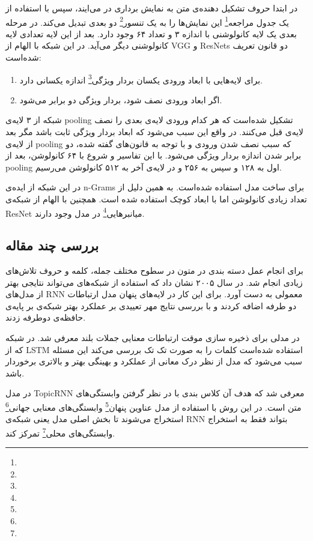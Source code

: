 \documentclass[12pt, a4paper, oneside]{report}
\begin{document}
در ابتدا حروف تشکیل دهنده‌ی متن به نمایش برداری در می‌ایند، سپس با استفاده از یک
جدول مراجعه\footnote{}
این نمایش‌ها را به یک
تنسور\footnote{}
دو بعدی تبدیل می‌کند. در مرحله بعدی یک لایه کانولوشنی با اندازه ۳ و تعداد ۶۴ وجود دارد. بعد از این
لایه تعدادی لایه کانولوشنی دیگر می‌آید. در این شبکه با الهام از
VGG
و
ResNets
دو قانون تعریف شده‌است:

\begin{enumerate}
    \item برای لایه‌هایی با ابعاد ورودی یکسان بردار ویژگی\footnote{} اندازه یکسانی دارد.
    \item اگر ابعاد ورودی نصف شود، بردار ویژگی دو برابر می‌شود.
\end{enumerate}

شبکه از ۳ لایه‌ی
pooling
تشکیل شده‌است که هر کدام ورودی لایه‌ی بعدی را نصف لایه‌ی قبل می‌کنند. در واقع این سبب می‌شود که ابعاد
بردار ویژگی ثابت باشد مگر بعد از لایه‌ی
pooling
که سبب نصف شدن ورودی و با توجه به قانون‌های گفته شده، دو برابر شدن اندازه بردار ویژگی می‌شود.
با این تفاسیر و شروع با ۶۴ کانولوشن، بعد از
pooling
اول به ۱۲۸ و سپس به ۲۵۶ و در لایه‌ی آخر به ۵۱۲ کانولوشن می‌رسیم.

در این شبکه از ایده‌ی
n-Grams
برای ساخت مدل استفاده شده‌است. به همین دلیل از تعداد زیادی کانولوشن اما با ابعاد کوچک استفاده شده است.
همچنین با الهام از شبکه‌ی
ResNet
میانبر‌هایی\footnote{}
در مدل وجود دارند.

\subsection{بررسی چند مقاله}

برای انجام عمل دسته بندی در متون در سطوح مختلف جمله، کلمه و حروف تلاش‌های زیادی انجام شد.
\cite{graves2005framewise}
در سال ۲۰۰۵ نشان داد که استفاده از شبکه‌های
می‌تواند نتایجی بهتر از مدل‌های
RNN
معمولی به دست آورد. برای این کار در لایه‌های پنهان مدل ارتباطات دو طرفه اضافه کردند و با بررسی نتایج مهر تعییدی
بر عملکرد بهتر شبکه‌ی بر پایه‌ی حافظه‌ی دوطرفه زدند.

در
\cite{liu2016recurrent}
مدلی برای ذخیره سازی موقت ارتباطات معنایی جملات بلند معرفی شد. در شبکه که از
LSTM
استفاده شده‌است کلمات را به صورت تک تک بررسی می‌کند این مسئله سبب می‌شود که مدل از نظر درک
معانی از عملکرد و بهینگی بهتر و بالاتری برخوردار باشد.

در
\cite{dieng2016topicrnn}
مدل
TopicRNN
معرفی شد که هدف آن کلاس بندی با در نظر گرفتن وابستگی‌های متن است.
در این روش با استفاده از
مدل عناوین پنهان\footnote{}
وابستگی‌های معنایی
جهانی\footnote{}
استخراج می‌شوند تا بخش اصلی مدل یعنی شبکه‌ی
RNN
بتواند فقط به استخراج وابستگی‌های
محلی\footnote{}
تمرکز کند.
\end{document}
